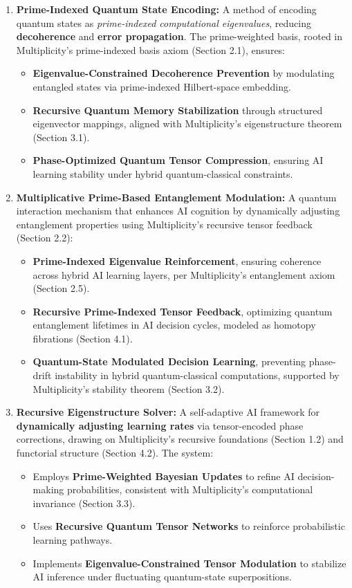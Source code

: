 \documentclass[12pt]{article}
\begin{document}
\begin{enumerate}
    \item \textbf{Prime-Indexed Quantum State Encoding:} A method of encoding quantum states as \textit{prime-indexed computational eigenvalues}, reducing \textbf{decoherence} and \textbf{error propagation}. The prime-weighted basis, rooted in Multiplicity’s prime-indexed basis axiom (Section 2.1), ensures:
    \begin{itemize}
        \item \textbf{Eigenvalue-Constrained Decoherence Prevention} by modulating entangled states via prime-indexed Hilbert-space embedding.
        \item \textbf{Recursive Quantum Memory Stabilization} through structured eigenvector mappings, aligned with Multiplicity’s eigenstructure theorem (Section 3.1).
        \item \textbf{Phase-Optimized Quantum Tensor Compression}, ensuring AI learning stability under hybrid quantum-classical constraints.
    \end{itemize}

    \item \textbf{Multiplicative Prime-Based Entanglement Modulation:} A quantum interaction mechanism that enhances AI cognition by dynamically adjusting entanglement properties using Multiplicity’s recursive tensor feedback (Section 2.2):
    \begin{itemize}
        \item \textbf{Prime-Indexed Eigenvalue Reinforcement}, ensuring coherence across hybrid AI learning layers, per Multiplicity’s entanglement axiom (Section 2.5).
        \item \textbf{Recursive Prime-Indexed Tensor Feedback}, optimizing quantum entanglement lifetimes in AI decision cycles, modeled as homotopy fibrations (Section 4.1).
        \item \textbf{Quantum-State Modulated Decision Learning}, preventing phase-drift instability in hybrid quantum-classical computations, supported by Multiplicity’s stability theorem (Section 3.2).
    \end{itemize}

    \item \textbf{Recursive Eigenstructure Solver:} A self-adaptive AI framework for \textbf{dynamically adjusting learning rates} via tensor-encoded phase corrections, drawing on Multiplicity’s recursive foundations (Section 1.2) and functorial structure (Section 4.2). The system:
    \begin{itemize}
        \item Employs \textbf{Prime-Weighted Bayesian Updates} to refine AI decision-making probabilities, consistent with Multiplicity’s computational invariance (Section 3.3).
        \item Uses \textbf{Recursive Quantum Tensor Networks} to reinforce probabilistic learning pathways.
        \item Implements \textbf{Eigenvalue-Constrained Tensor Modulation} to stabilize AI inference under fluctuating quantum-state superpositions.
    \end{itemize}
\end{enumerate}
\end{document}
